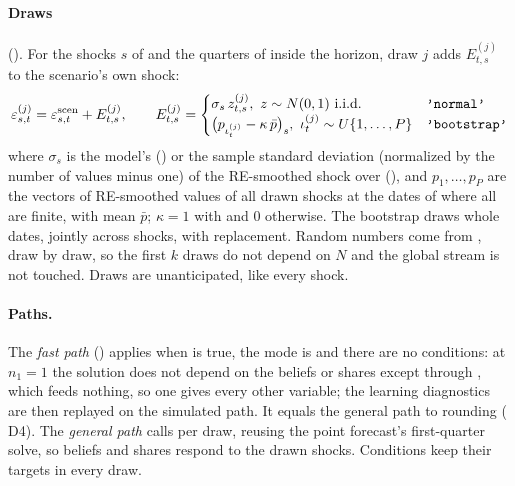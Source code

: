\documentclass[11pt,a4paper]{article}
\DeclareRobustCommand{\codem}[1]{\texttt{\detokenize{#1}}}
\begin{document}
\paragraph{Draws} (). For the shocks $s$ of  and the
quarters of  inside the horizon, draw $j$ adds $E^{(j)}_{t,s}$ to the
scenario's own shock:
\begin{equation}\label{eq:draws}
  \varepsilon^{(j)}_{s,t} = \varepsilon^{\text{scen}}_{s,t} + E^{(j)}_{t,s},\qquad
  E^{(j)}_{t,s} =
  \begin{cases}
    \sigma_s\, z^{(j)}_{t,s},\ z \sim N(0,1)\ \text{i.i.d.} & \text{\codem{'normal'}}\\
    \bigl(p_{\iota^{(j)}_t} - \kappa\,\bar p\bigr)_s,\ \iota^{(j)}_t\sim U\{1,\dots,P\} & \text{\codem{'bootstrap'}}
  \end{cases}
\end{equation}
where $\sigma_s$ is the model's  () or the sample standard
deviation (normalized by the number of values minus one) of the RE-smoothed shock over
(), and $p_1,\dots,p_P$ are the vectors of RE-smoothed values of all drawn shocks at
the dates of  where all are finite, with mean $\bar p$; $\kappa = 1$ with  and 0 otherwise. The bootstrap draws whole
dates, jointly across shocks, with replacement. Random numbers come from
, draw by draw, so the first $k$ draws do not depend on
$N$ and the global stream is not touched. Draws are unanticipated, like every shock.

\paragraph{Paths.} The \emph{fast path} () applies when
 is true, the mode is  and there are no conditions: at
$n_1 = 1$ the solution does not depend on the beliefs or shares except through ,
which feeds nothing, so one  gives every other
variable; the learning diagnostics are then replayed on the simulated path. It equals the general
path to rounding ( D4). The \emph{general path} calls
 per draw, reusing the point forecast's first-quarter solve, so beliefs and
shares respond to the drawn shocks. Conditions keep their targets in every draw.
\end{document}
